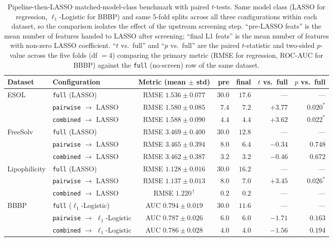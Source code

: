 \documentclass[11pt,a4paper]{article}
\begin{document}
\begin{table}[!htbp]
\centering
\small
\caption{Pipeline-then-LASSO matched-model-class benchmark with paired $t$-tests. Same model class (LASSO for regression, $\ell_1$-Logistic for BBBP) and same 5-fold splits across all three configurations within each dataset, so the comparison isolates the effect of the upstream screening step. ``pre-LASSO feats'' is the mean number of features handed to LASSO after screening; ``final L1 feats'' is the mean number of features with non-zero LASSO coefficient. ``$t$ vs.\ full'' and ``$p$ vs.\ full'' are the paired $t$-statistic and two-sided $p$-value across the five folds (df $=4$) comparing the primary metric (RMSE for regression, ROC-AUC for BBBP) against the \texttt{full} (no-screen) row of the same dataset.}
\label{tab:matched_class}
\begin{tabular}{llcrrrr}
\toprule
Dataset & Configuration & Metric (mean $\pm$ std) & pre & final & $t$ vs.\ full & $p$ vs.\ full\\
\midrule
ESOL          & \texttt{full} (LASSO)                       & RMSE $1.536\pm 0.077$  & $30.0$         & $17.6$ & --- & ---\\
              & \texttt{pairwise} $\to$ LASSO               & RMSE $1.580\pm 0.085$  & $\phantom{0}7.4$ & $\phantom{0}7.2$ & $+3.77$ & $0.020^{*}$\\
              & \texttt{combined} $\to$ LASSO               & RMSE $1.588\pm 0.090$  & $\phantom{0}4.4$ & $\phantom{0}4.4$ & $+3.62$ & $0.022^{*}$\\
\midrule
FreeSolv      & \texttt{full} (LASSO)                       & RMSE $3.469\pm 0.400$  & $30.0$         & $12.8$ & --- & ---\\
              & \texttt{pairwise} $\to$ LASSO               & RMSE $3.465\pm 0.394$  & $\phantom{0}8.0$ & $\phantom{0}6.4$ & $-0.34$ & $0.748$\\
              & \texttt{combined} $\to$ LASSO               & RMSE $3.462\pm 0.387$  & $\phantom{0}3.2$ & $\phantom{0}3.2$ & $-0.46$ & $0.672$\\
\midrule
Lipophilicity & \texttt{full} (LASSO)                       & RMSE $1.128\pm 0.016$  & $30.0$         & $16.2$ & --- & ---\\
              & \texttt{pairwise} $\to$ LASSO               & RMSE $1.137\pm 0.013$  & $\phantom{0}8.0$ & $\phantom{0}7.0$ & $+3.45$ & $0.026^{*}$\\
              & \texttt{combined} $\to$ LASSO               & RMSE $1.220^{\,\dagger}$       & $\phantom{0}0.2$ & $\phantom{0}0.2$ & --- & ---\\
\midrule
BBBP          & \texttt{full} ($\ell_1$-Logistic)           & AUC $0.794\pm 0.019$   & $30.0$         & $11.6$ & --- & ---\\
              & \texttt{pairwise} $\to$ $\ell_1$-Logistic   & AUC $0.787\pm 0.026$   & $\phantom{0}6.0$ & $\phantom{0}6.0$ & $-1.71$ & $0.163$\\
              & \texttt{combined} $\to$ $\ell_1$-Logistic   & AUC $0.786\pm 0.028$   & $\phantom{0}4.0$ & $\phantom{0}4.0$ & $-1.56$ & $0.194$\\
\bottomrule
\end{tabular}


\end{table}
\end{document}
